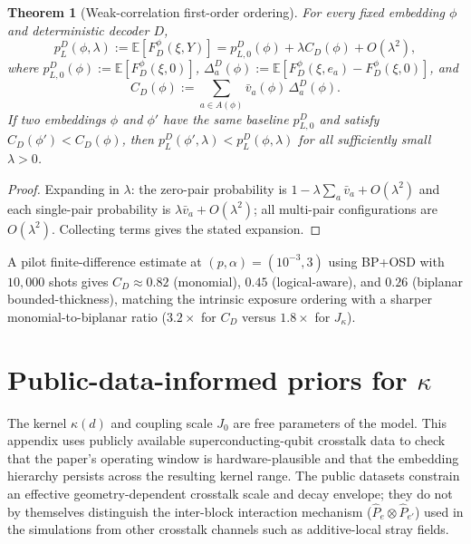 \documentclass[
aps,
prx,
10pt,
twocolumn,
groupedaddress,
longbibliography,
nofootinbib,
floatfix
]{revtex4-2}
\newtheorem{theorem}{Theorem}
\theoremstyle{definition}
\begin{document}
\begin{theorem}[Weak-correlation first-order ordering]
\label{thm:first-order-la}
For every fixed embedding $\phi$ and deterministic decoder $D$,
\begin{equation}
p_L^D(\phi,\lambda)
:=
\mathbb E\left[F_D^{\phi}(\xi,Y)\right]
=
p_{L,0}^D(\phi)+\lambda C_D(\phi)+O(\lambda^2),
\end{equation}
where $p_{L,0}^D(\phi):=\mathbb E[F_D^{\phi}(\xi,0)]$, $\Delta_a^D(\phi):=\mathbb E[F_D^{\phi}(\xi,e_a)-F_D^{\phi}(\xi,0)]$, and
\begin{equation}
C_D(\phi):=\sum_{a\in A(\phi)} \bar v_a(\phi)\,\Delta_a^D(\phi).
\end{equation}
If two embeddings $\phi$ and $\phi'$ have the same baseline $p_{L,0}^D$ and satisfy $C_D(\phi')<C_D(\phi)$, then $p_L^D(\phi',\lambda)<p_L^D(\phi,\lambda)$ for all sufficiently small $\lambda>0$.
\end{theorem}

\begin{proof}
Expanding in $\lambda$: the zero-pair probability is $1-\lambda\sum_a\bar v_a+O(\lambda^2)$ and each single-pair probability is $\lambda\bar v_a+O(\lambda^2)$; all multi-pair configurations are $O(\lambda^2)$. Collecting terms gives the stated expansion.
\end{proof}

A pilot finite-difference estimate at $(p,\alpha)=(10^{-3},3)$ using BP+OSD with $10{,}000$ shots gives $C_D\approx 0.82$ (monomial), $0.45$ (logical-aware), and $0.26$ (biplanar bounded-thickness), matching the intrinsic exposure ordering with a sharper monomial-to-biplanar ratio ($3.2\times$ for $C_D$ versus $1.8\times$ for $J_\kappa$).

\section{Public-data-informed priors for \texorpdfstring{$\kappa$}{kappa}}
\label{app:hardware}

The kernel $\kappa(d)$ and coupling scale $J_0$ are free parameters of the model. This appendix uses publicly available superconducting-qubit crosstalk data to check that the paper's operating window is hardware-plausible and that the embedding hierarchy persists across the resulting kernel range. The public datasets constrain an effective geometry-dependent crosstalk scale and decay envelope; they do not by themselves distinguish the inter-block interaction mechanism ($\hat P_e\otimes\hat P_{e'}$) used in the simulations from other crosstalk channels such as additive-local stray fields.
\end{document}
